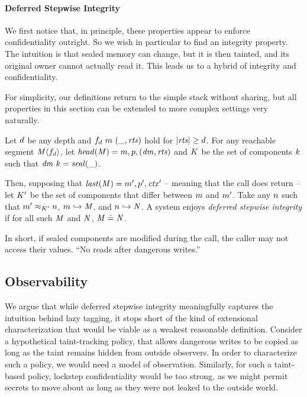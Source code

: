 \documentclass[acmsmall,review,anonymous]{acmart}\settopmatter{printfolios=true,printccs=false,printacmref=false}
\begin{document}
\paragraph*{Deferred Stepwise Integrity}

We first notice that, in principle, these properties appear to enforce
confidentiality outright. So we wish in particular to find an integrity
property. The intuition is that sealed memory can change, but it is
then tainted, and its original owner cannot actually read it. This
leads us to a hybrid of integrity and confidentiality.

For simplicity, our definitions return to the simple stack without sharing,
but all properties in this section can be extended to more complex settings
very naturally.

 Let \(d\) be any depth and \(f_d ~ m ~ (\_, \mathit{rts})\) hold for
\(|\mathit{rts}| \geq d\). For any reachable segment \(\mathit{M} \langle f_d \rangle\),
let \(\mathit{head}(\mathit{M}) = m,p,(\mathit{dm},\mathit{rts})\) and
\(K\) be the set of components \(k\) such that \(\mathit{dm} ~ k = \mathit{seal(\_)}\).

Then, supposing that \(\mathit{last}(\mathit{M}) = m',p',\mathit{ctx}'\) -- meaning that the
call does return -- let \(K'\) be the set of components that differ
between \(m\) and \(m'\). Take any \(n\) such that
\(m' \approx_{K'} n\), \(m \hookrightarrow \mathit{M}\), and
\(n \hookrightarrow \mathit{N}\). A system enjoys
{\em deferred stepwise integrity} if for all such \(\mathit{M}\) and \(\mathit{N}\),
\(\mathit{M} \doteq \mathit{N}\).

In short, if sealed components are modified during the call, the caller may not
access their values. ``No reads after dangerous writes.''

\subsection{Observability}

We argue that while deferred stepwise integrity meaningfully captures the intuition
behind lazy tagging, it stops short of the kind of extensional characterization
that would be viable as a weakest reasonable definition. Consider a hypothetical
taint-tracking policy, that allows dangerous writes to be copied as long as the
taint remains hidden from outside observers. In order to characterize
such a policy, we would need a model of observation.
Similarly, for such a taint-based policy, lockstep confidentiality would be too
strong, as we might permit secrets to move about as long as they were not
leaked to the outside world.
\end{document}
